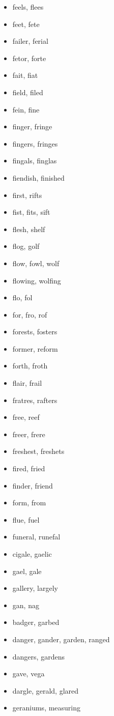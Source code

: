 \documentclass[a4wide,11pt]{report}
\begin{document}
\begin{itemize}
  \item feels, flees
  \item feet, fete
  \item failer, ferial
  \item fetor, forte
  \item fait, fiat
  \item field, filed
  \item fein, fine
  \item finger, fringe
  \item fingers, fringes
  \item fingals, finglas
  \item fiendish, finished
  \item first, rifts
  \item fist, fits, sift
  \item flesh, shelf
  \item flog, golf
  \item flow, fowl, wolf
  \item flowing, wolfing
  \item flo, fol
  \item for, fro, rof
  \item forests, fosters
  \item former, reform
  \item forth, froth
  \item flair, frail
  \item fratres, rafters
  \item free, reef
  \item freer, frere
  \item freshest, freshets
  \item fired, fried
  \item finder, friend
  \item form, from
  \item flue, fuel
  \item funeral, runefal
  \item cigale, gaelic
  \item gael, gale
  \item gallery, largely
  \item gan, nag
  \item badger, garbed
  \item danger, gander, garden, ranged
  \item dangers, gardens
  \item gave, vega
  \item dargle, gerald, glared
  \item geraniums, measuring

\end{itemize}
\end{document}
